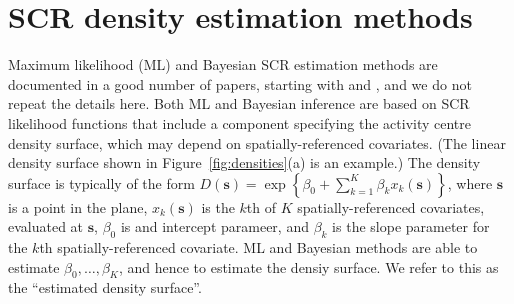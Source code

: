 \documentclass[10pt,a4paper]{article}
\begin{document}



\section{SCR density estimation methods}

Maximum likelihood (ML) and Bayesian SCR estimation methods are documented in a good number of papers, starting with \cite{Borchers+Efford:08} and \cite{Royle+Young:08}, and we do not repeat the details here. Both ML and Bayesian inference are based on SCR likelihood functions that include a component specifying the activity centre density surface, which may depend on spatially-referenced covariates. (The linear density surface shown in Figure~\ref{fig:densities}(a) is an example.) The density surface is typically of the form $D(\bm{s})=\exp\left\{\beta_0 + \sum_{k=1}^K\beta_kx_k(\bm{s})\right\}$, where $\bm{s}$ is a point in the plane, $x_k(\bm{s})$ is the $k$th of $K$ spatially-referenced covariates, evaluated at $\bm{s}$, $\beta_0$ is and intercept parameer, and $\beta_k$ is the slope parameter for the $k$th spatially-referenced covariate. ML and Bayesian methods are able to estimate $\beta_0,\ldots,\beta_K$, and hence to estimate the densiy surface. We refer to this as the ``estimated density surface''.
\end{document}
